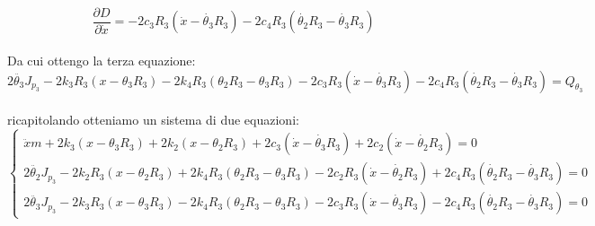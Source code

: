 \documentclass{article}
\begin{document}
\begin{equation*}
\frac{\partial D}{\partial \dot{x}} = -2c_3R_3(\dot{x}-\dot{\theta_3}R_3) - 2c_4R_3(\dot{\theta_2} R_3 - \dot{\theta_3} R_3)
\end{equation*}
\\
Da cui ottengo la terza equazione: 
\\
\begin{equation*}
 2\ddot{\theta_3}J_{p_3} - 2k_{3}R_{3}(x - \theta_{3}R_{3}) - 2k_{4}R_3(\theta_{2}R_3 - \theta_{3}R_{3}) - 2c_{3}R_{3}(\dot{x}-\dot{\theta_3}R_{3}) - 2c_{4}R_{3}(\dot{\theta_2}R_3 - \dot{\theta_{3}}R_{3}) = Q_{\theta_3}
\end{equation*}
\\
ricapitolando otteniamo un sistema di due equazioni:
\begin{equation*}
\begin{cases}
 \ddot{x}m + 2k_{3}(x-\theta_{3}R_{3}) + 2k_{2}(x- \theta_{2}R_{3})+ 2c_{3}(\dot{x}-\dot{\theta_3}R_{3}) + 2c_{2}(\dot{x} - \dot{\theta_{2}}R_{3}) = 0\\
  2\ddot{\theta_2}J_{p_3} - 2k_{2}R_{3}(x - \theta_{2}R_{3}) + 2k_{4}R_3(\theta_{2}R_3 - \theta_{3}R_{3}) - 2c_{2}R_{3}(\dot{x}-\dot{\theta_2}R_{3}) + 2c_{4}R_{3}(\dot{\theta_2}R_3 - \dot{\theta_{3}}R_{3}) = 0\\
   2\ddot{\theta_3}J_{p_3} - 2k_{3}R_{3}(x - \theta_{3}R_{3}) - 2k_{4}R_3(\theta_{2}R_3 - \theta_{3}R_{3}) - 2c_{3}R_{3}(\dot{x}-\dot{\theta_3}R_{3}) - 2c_{4}R_{3}(\dot{\theta_2}R_3 - \dot{\theta_{3}}R_{3}) = 0
\end{cases}
\end{equation*}
\end{document}
